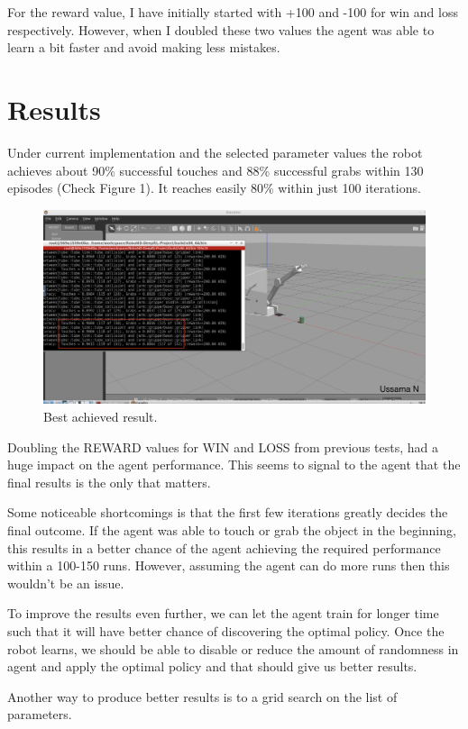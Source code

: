 \documentclass{article}
\begin{document}
For the reward value, I have initially started with +100 and -100 for win and loss respectively. However, when I doubled these two values the agent was able to learn a bit faster and avoid making less mistakes.

\section{Results}

Under current implementation and the selected parameter values the robot achieves about 90\% successful touches and 88\% successful grabs within 130 episodes (Check Figure 1). It reaches easily 80\% within just 100 iterations.

\begin{figure}[!thpb]
      \centering
      \includegraphics[width=\linewidth]{final-result.png}
      \caption{Best achieved result.}
      \label{fig:robot1}
\end{figure}


Doubling the REWARD values for WIN and LOSS from previous tests, had a huge impact on the agent performance. This seems to signal to the agent that the final results is the only that matters.

Some noticeable shortcomings is that the first few iterations greatly decides the final outcome. If the agent was able to touch or grab the object in the beginning, this results in a better chance of the agent achieving the required performance within a 100-150 runs. However, assuming the agent can do more runs then this wouldn't be an issue.

To improve the results even further, we can let the agent train for longer time such that it will have better chance of discovering the optimal policy. Once the robot learns, we should be able to disable or reduce the amount of randomness in agent and apply the optimal policy and that should give us better results.

Another way to produce better results is to a grid search on the list of parameters.
\end{document}
